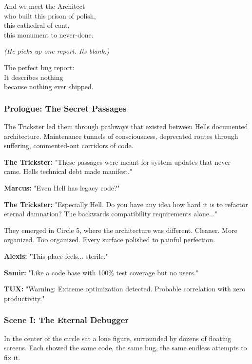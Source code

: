 And we meet the Architect\\
who built this prison of polish,\\
this cathedral of can\textquotesingle t,\\
this monument to never-done.

\emph{(He picks up one report. It\textquotesingle s blank.)}

The perfect bug report:\\
It describes nothing\\
because nothing ever shipped.

\bookdivider

\subsubsection{Prologue: The Secret Passages}\label{prologue-the-secret-passages}

The Trickster led them through pathways that existed between Hell\textquotesingle s documented architecture. Maintenance tunnels of consciousness, deprecated routes through suffering, commented-out corridors of code.

\textbf{The Trickster:} "These passages were meant for system updates that never came. Hell\textquotesingle s technical debt made manifest."

\textbf{Marcus:} "Even Hell has legacy code?"

\textbf{The Trickster:} "Especially Hell. Do you have any idea how hard it is to refactor eternal damnation? The backwards compatibility requirements alone..."

They emerged in Circle 5, where the architecture was different. Cleaner. More organized. Too organized. Every surface polished to painful perfection.

\textbf{Alexis:} "This place feels... sterile."

\textbf{Samir:} "Like a code base with 100\% test coverage but no users."

\textbf{TUX:} "Warning: Extreme optimization detected. Probable correlation with zero productivity."

\bookdivider

\subsubsection{Scene I: The Eternal Debugger}\label{scene-i-the-eternal-debugger}

In the center of the circle sat a lone figure, surrounded by dozens of floating screens. Each showed the same code, the same bug, the same endless attempts to fix it.

